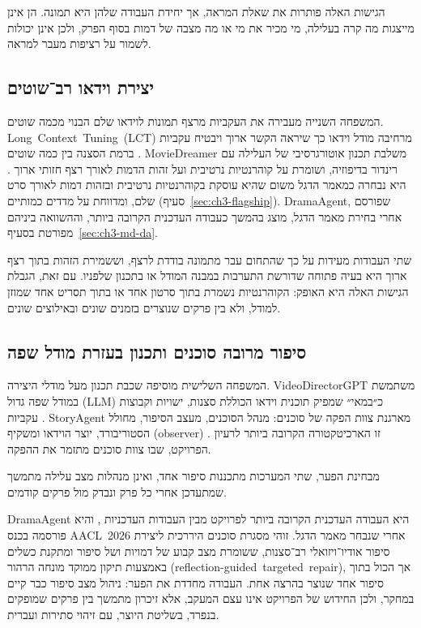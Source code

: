 הגישות האלה פותרות את שאלת המראה, אך יחידת העבודה שלהן היא תמונה. הן אינן מייצגות מה קרה בעלילה, מי מכיר את מי או מה מצבה של דמות בסוף הפרק, ולכן אינן יכולות לשמור על רציפות מעבר למראה.

\subsection{יצירת וידאו רב־שוטים}
המשפחה השנייה מעבירה את העקביות מרצף תמונות לוידאו שלם הבנוי מכמה שוטים. \mbox{\textenglish{Long Context Tuning (LCT)}} מרחיבה מודל וידאו כך שיראה הקשר ארוך ויבטיח עקביות ברמת הסצנה בין כמה שוטים \cite{guo2025lct}. \textenglish{MovieDreamer} משלבת תכנון אוטורגרסיבי של העלילה עם רינדור בדיפוזיה, ושומרת על קוהרנטיות נרטיבית ועל זהות הדמות לאורך רצף חזותי ארוך \cite{zhao2025moviedreamer}. היא נבחרה כמאמר הדגל משום שהיא עוסקת בקוהרנטיות נרטיבית ובזהות דמות לאורך סרט שלם, ומדווחת על מדדים כמותיים (סעיף~\ref{sec:ch3-flagship}). \textenglish{DramaAgent}, שפורסם אחרי בחירת מאמר הדגל, מוצג בהמשך כעבודה העדכנית הקרובה ביותר, וההשוואה ביניהם מפורטת בסעיף~\ref{sec:ch3-md-da}.

שתי העבודות מעידות על כך שהתחום עבר מתמונה בודדת לרצף, וששמירת הזהות בתוך רצף ארוך היא בעיה פתוחה שדורשת התערבות במבנה המודל או בתכנון שלפניו. עם זאת, הגבלת הגישות האלה היא האופק: הקוהרנטיות נשמרת בתוך סרטון אחד או בתוך תסריט אחד שמוזן למודל, ולא בין פרקים שנוצרים בזמנים שונים ובאילוצים שונים.

\subsection{סיפור מרובה סוכנים ותכנון בעזרת מודל שפה}
המשפחה השלישית מוסיפה שכבת תכנון מעל מודלי היצירה. \textenglish{VideoDirectorGPT} משתמשת במודל שפה גדול (\textenglish{LLM}) כ״במאי״ שמפיק תוכנית וידאו הכוללת סצנות, ישויות וקבוצות עקביות \cite{lin2023videodirectorgpt}. \mbox{\textenglish{StoryAgent}} מארגנת צוות הפקה של סוכנים: מנהל הסוכנים, מעצב הסיפור, מחולל הסטוריבורד, יוצר הוידאו ומשקיף (\textenglish{observer}) \cite{hu2024storyagent}. זו הארכיטקטורה הקרובה ביותר לרעיון הפרויקט, שבו צוות סוכנים מתזמר את ההפקה.

מבחינת הפער, שתי המערכות מתכננות סיפור אחד, ואינן מנהלות מצב עלילה מתמשך שמתעדכן אחרי כל פרק ונבדק מול פרקים קודמים.

\textenglish{DramaAgent} היא העבודה העדכנית הקרובה ביותר לפרויקט מבין העבודות העדכניות \cite{huang2026dramaagent}, והיא פורסמה בכנס \mbox{\textenglish{AACL 2026}} אחרי שנבחר מאמר הדגל. זוהי מסגרת סוכנים היררכית ליצירת סיפור אודיו־ויזואלי רב־סצנות, ששומרת מצב קבוע של דמויות ושל סיפור ומתקנת כשלים באמצעות תיקון ממוקד מונחה הרהור (\mbox{\textenglish{reflection-guided targeted repair}}), אך הכול בתוך סיפור אחד שנוצר בהרצה אחת. העבודה מחדדת את הפער: ניהול מצב סיפור כבר קיים במחקר, ולכן החידוש של הפרויקט אינו עצם המעקב, אלא זיכרון מתמשך בין פרקים שמופקים בנפרד, בשליטת היוצר, עם זיהוי סתירות ועברית.

